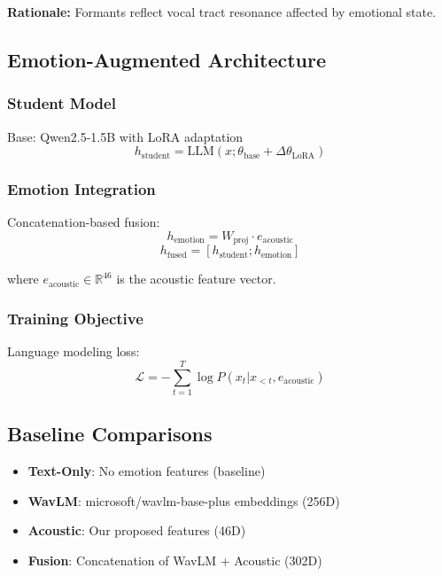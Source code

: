 \textbf{Rationale:} Formants reflect vocal tract resonance affected by emotional state.

\subsection{Emotion-Augmented Architecture}
\label{subsec:architecture}

\subsubsection{Student Model}
Base: Qwen2.5-1.5B with LoRA adaptation
\begin{equation}
h_{\text{student}} = \text{LLM}(x; \theta_{\text{base}} + \Delta\theta_{\text{LoRA}})
\end{equation}

\subsubsection{Emotion Integration}
Concatenation-based fusion:
\begin{equation}
h_{\text{emotion}} = W_{\text{proj}} \cdot e_{\text{acoustic}}
\end{equation}
\begin{equation}
h_{\text{fused}} = [h_{\text{student}}; h_{\text{emotion}}]
\end{equation}

where $e_{\text{acoustic}} \in \mathbb{R}^{46}$ is the acoustic feature vector.

\subsubsection{Training Objective}
Language modeling loss:
\begin{equation}
\mathcal{L} = -\sum_{t=1}^{T} \log P(x_t | x_{<t}, e_{\text{acoustic}})
\end{equation}

\subsection{Baseline Comparisons}
\label{subsec:baselines}

\begin{itemize}
    \item \textbf{Text-Only}: No emotion features (baseline)
    \item \textbf{WavLM}: microsoft/wavlm-base-plus embeddings (256D)
    \item \textbf{Acoustic}: Our proposed features (46D)
    \item \textbf{Fusion}: Concatenation of WavLM + Acoustic (302D)
\end{itemize}

